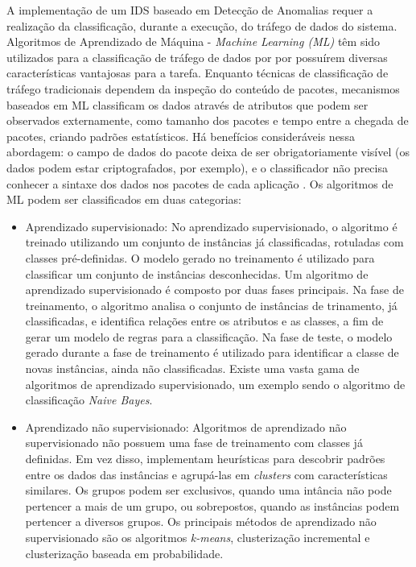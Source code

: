 \documentclass[cic,tc]{iiufrgs}
\begin{document}
A implementação de um IDS baseado em Detecção de Anomalias requer a realização da classificação, durante a execução, do tráfego de dados do sistema. Algoritmos de Aprendizado de Máquina - \emph{Machine Learning (ML)} têm sido utilizados para a classificação de tráfego de dados por por possuírem diversas características vantajosas para a tarefa. Enquanto técnicas de classificação de tráfego tradicionais dependem da inspeção do conteúdo de pacotes, mecanismos baseados em ML classificam os dados através de atributos que podem ser observados externamente, como tamanho dos pacotes e tempo entre a chegada de pacotes, criando padrões estatísticos. Há benefícios consideráveis nessa abordagem: o campo de dados do pacote deixa de ser obrigatoriamente visível  (os dados podem estar criptografados, por exemplo), e o classificador não precisa conhecer a sintaxe dos dados nos pacotes de cada aplicação \cite{nguyen2008survey}. Os algoritmos de ML podem ser classificados em duas categorias:

\begin{itemize}
\item{Aprendizado supervisionado}: No aprendizado supervisionado, o algoritmo é treinado utilizando um conjunto de instâncias já classificadas, rotuladas com classes pré-definidas. O modelo gerado no treinamento é utilizado para classificar um conjunto de instâncias desconhecidas. Um algoritmo de aprendizado supervisionado é composto por duas fases principais. Na fase de treinamento, o algoritmo analisa o conjunto de instâncias de trinamento, já classificadas, e identifica relações entre os atributos e as classes, a fim de gerar um modelo de regras para a classificação. Na fase de teste, o modelo gerado durante a fase de treinamento é utilizado para identificar a classe de novas instâncias, ainda não classificadas. Existe uma vasta gama de algoritmos de aprendizado supervisionado, um exemplo sendo o algoritmo de classificação \emph{Naive Bayes}.
\item{Aprendizado não supervisionado}: Algoritmos de aprendizado não supervisionado não possuem uma fase de treinamento com classes já definidas. Em vez disso, implementam heurísticas para descobrir padrões entre os dados das instâncias e agrupá-las em \emph{clusters} com características similares. Os grupos podem ser exclusivos, quando uma intância não pode pertencer a mais de um grupo, ou sobrepostos, quando as instâncias podem pertencer a diversos grupos. Os principais métodos de aprendizado não supervisionado são os algoritmos \emph{k-means}, clusterização incremental e clusterização baseada em probabilidade.
\end{itemize}
\end{document}

